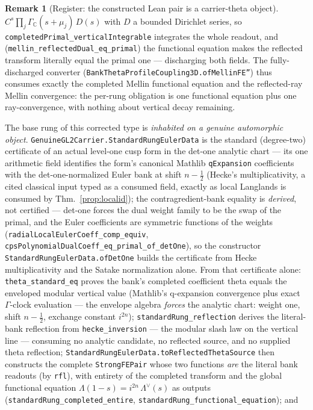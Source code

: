\documentclass[11pt]{article}
\theoremstyle{definition}
\newtheorem{remark}[theorem]{Remark}
\begin{document}
\begin{remark}[Register: the constructed Lean pair is a carrier-theta object]
$C^{s}\prod_j\Gamma_{\mathbb C}(s{+}\mu_j)\,D(s)$ with $D$ a bounded Dirichlet series, so
\texttt{completedPrimal\_verticalIntegrable} integrates the whole readout, and
(\texttt{mellin\_reflectedDual\_eq\_primal}) the functional equation makes the reflected transform
literally equal the primal one --- discharging both fields.  The fully-discharged converter
(\texttt{BankThetaProfileCoupling3D.ofMellinFE''}) thus consumes exactly the completed Mellin
functional equation and the reflected-ray Mellin convergence: the per-rung obligation is one
functional equation plus one ray-convergence, with nothing about vertical decay remaining.

The base rung of this corrected type is \emph{inhabited on a genuine automorphic object}.
\texttt{GenuineGL2Carrier.StandardRungEulerData} is the standard (degree-two) certificate of an
actual level-one cusp form in the det-one analytic chart --- its one arithmetic field identifies
the form's canonical Mathlib \texttt{qExpansion} coefficients with the det-one-normalized Euler
bank at shift $n-\tfrac12$ (Hecke's multiplicativity, a cited classical input typed as a
consumed field, exactly as local Langlands is consumed by Thm.~\ref{prop:localid}); the
contragredient-bank equality is \emph{derived}, not certified --- det-one forces the dual weight
family to be the swap of the primal, and the Euler coefficients are symmetric functions of the
weights (\texttt{radialLocalEulerCoeff\_comp\_equiv},
\texttt{cpsPolynomialDualCoeff\_eq\_primal\_of\_detOne}), so the constructor
\texttt{StandardRungEulerData.ofDetOne} builds the certificate from Hecke multiplicativity and
the Satake normalization alone.  From that
certificate alone: \texttt{theta\_standard\_eq} proves the bank's completed coefficient theta
equals the enveloped modular vertical value (Mathlib's q-expansion convergence plus exact
$\Gamma$-clock evaluation --- the envelope algebra \emph{forces} the analytic chart: weight one,
shift $n-\tfrac12$, exchange constant $i^{2n}$); \texttt{standardRung\_reflection} derives the
literal-bank reflection from \texttt{hecke\_inversion} --- the modular slash law on the vertical
line --- consuming no analytic candidate, no reflected source, and no supplied theta reflection;
\texttt{StandardRungEulerData.toReflectedThetaSource} then constructs the complete
\texttt{StrongFEPair} whose two functions \emph{are} the literal bank readouts (by \texttt{rfl}),
with entirety of the completed transform and the global functional equation
$\Lambda(1-s)=i^{2n}\,\Lambda^\vee(s)$ as outputs
(\texttt{standardRung\_completed\_entire}, \texttt{standardRung\_functional\_equation}); and

\end{remark}
\end{document}
